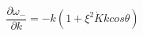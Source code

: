 \begin{equation}
\frac{{\partial}{\omega}_{-}}{{\partial}k}= -k(1+{\xi}^{2}\dot{K}k cos{\theta})
\label{38}
\end{equation}

